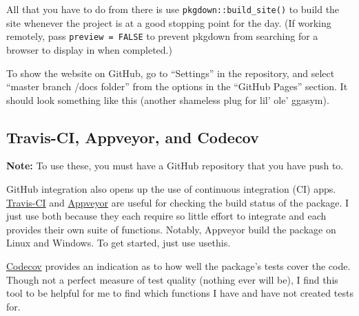 \documentclass[]{book}
\newenvironment{Shaded}{\begin{snugshade}}{\end{snugshade}}
\newcommand{\KeywordTok}[1]{\textcolor[rgb]{0.13,0.29,0.53}{\textbf{#1}}}
\newcommand{\CommentTok}[1]{\textcolor[rgb]{0.56,0.35,0.01}{\textit{#1}}}
\newcommand{\OperatorTok}[1]{\textcolor[rgb]{0.81,0.36,0.00}{\textbf{#1}}}
\newcommand{\NormalTok}[1]{#1}
\begin{document}
All that you have to do from there is use
\texttt{pkgdown::build\_site()} to build the site whenever the project
is at a good stopping point for the day. (If working remotely, pass
\texttt{preview\ =\ FALSE} to prevent pkgdown from searching for a
browser to display in when completed.)

To show the website on GitHub, go to ``Settings'' in the repository, and
select ``master branch /docs folder'' from the options in the ``GitHub
Pages'' section. It should look something like this (another shameless
plug for lil' ole' ggasym).

\subsection{Travis-CI, Appveyor, and
Codecov}\label{travis-ci-appveyor-and-codecov}

\textbf{Note:} To use these, you must have a GitHub repository that you
have push to.

GitHub integration also opens up the use of continuous integration (CI)
apps. \href{https://travis-ci.org}{Travis-CI} and
\href{https://www.appveyor.com}{Appveyor} are useful for checking the
build status of the package. I just use both because they each require
so little effort to integrate and each provides their own suite of
functions. Notably, Appveyor build the package on Linux and Windows. To
get started, just use usethis.

\href{https://codecov.io}{Codecov} provides an indication as to how well
the package's tests cover the code. Though not a perfect measure of test
quality (nothing ever will be), I find this tool to be helpful for me to
find which functions I have and have not created tests for.

\begin{Shaded}
\end{Shaded}
\end{document}
